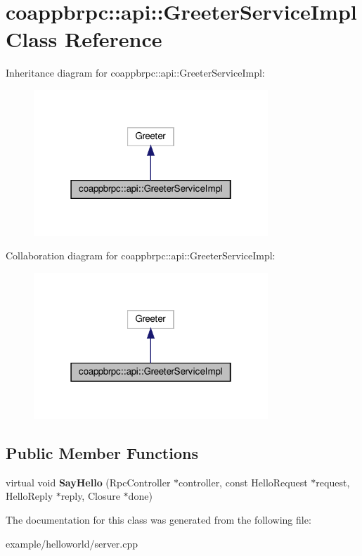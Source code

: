 \hypertarget{classcoappbrpc_1_1api_1_1GreeterServiceImpl}{}\section{coappbrpc\+:\+:api\+:\+:Greeter\+Service\+Impl Class Reference}
\label{classcoappbrpc_1_1api_1_1GreeterServiceImpl}


Inheritance diagram for coappbrpc\+:\+:api\+:\+:Greeter\+Service\+Impl\+:
\nopagebreak
\begin{figure}[H]
\begin{center}
\leavevmode
\includegraphics[width=250pt]{classcoappbrpc_1_1api_1_1GreeterServiceImpl__inherit__graph}
\end{center}
\end{figure}


Collaboration diagram for coappbrpc\+:\+:api\+:\+:Greeter\+Service\+Impl\+:
\nopagebreak
\begin{figure}[H]
\begin{center}
\leavevmode
\includegraphics[width=250pt]{classcoappbrpc_1_1api_1_1GreeterServiceImpl__coll__graph}
\end{center}
\end{figure}
\subsection*{Public Member Functions}
\begin{DoxyCompactItemize}
\item 
\mbox{\label{classcoappbrpc_1_1api_1_1GreeterServiceImpl_a009b97643d9728170104e367b8f40167}} 
virtual void {\bfseries Say\+Hello} (Rpc\+Controller $\ast$controller, const Hello\+Request $\ast$request, Hello\+Reply $\ast$reply, Closure $\ast$done)
\end{DoxyCompactItemize}


The documentation for this class was generated from the following file\+:\begin{DoxyCompactItemize}
\item 
example/helloworld/server.\+cpp\end{DoxyCompactItemize}
